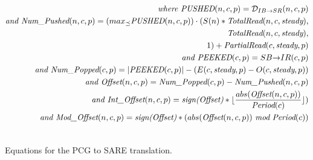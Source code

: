 \begin{figure}[t]
{\begin{minipage}{6.3in}
\begin{itemize}
\begin{align}
%
%
\mt{where }\mt{PUSHED}(n,c,p) = {\cal D}_{IB {\small \rightarrow} SR}(n,c,p) \\ \nonumber
\mt{and }\mt{Num\_Pushed}(n,c,p) = 
  (max_{\preceq}\mt{PUSHED}(n,c,p)) \cdot (S(n) * \mt{TotalRead}(n,c,\mt{steady}), \\ \nonumber
                                        \mt{TotalRead}(n,c,\mt{steady}), \\ \nonumber
                                        1 ) + \mt{PartialRead}(c, \mt{steady}, p) \\ \nonumber
\mt{and }\mt{PEEKED}(c,p) = {SB {\small \rightarrow} IR}(c,p) \\ \nonumber
\mt{and }\mt{Num\_Popped}(c,p) = |\mt{PEEKED}(c,p)| - (E(c,\mt{steady},p) - O(c,\mt{steady},p)) \\ \nonumber
\mt{and }\mt{Offset}(n,c,p) = \mt{Num\_Popped}(c,p)-\mt{Num\_Pushed}(n,c,p) \\ \nonumber
\mt{and }\mt{Int\_Offset}(n,c,p) = \mt{sign(Offset)}*\lfloor \frac{abs(\mt{Offset}(n,c,p))}{\mt{Period}(c)} \rfloor) \\ \nonumber
\mt{and }\mt{Mod\_Offset}(n,c,p) = \mt{sign(Offset)}*(abs(\mt{Offset}(n,c,p))~\mt{mod}~\mt{Period}(c)) \\ \nonumber
%
\end{align}
%
\end{itemize}
\end{minipage}}
\caption{Equations for the PCG to SARE translation.
\protect\label{fig:pcgtosare3}}
\end{figure}

